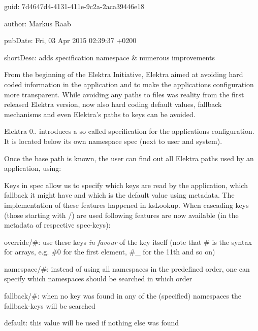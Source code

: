 
\begin{DoxyItemize}
\item guid\+: 7d4647d4-\/4131-\/411e-\/9c2a-\/2aca39446e18
\item author\+: Markus Raab
\item pub\+Date\+: Fri, 03 Apr 2015 02\+:39\+:37 +0200
\item short\+Desc\+: adds specification namespace \& numerous improvements
\end{DoxyItemize}

From the beginning of the Elektra Initiative, Elektra aimed at avoiding hard coded information in the application and to make the application\textquotesingle{}s configuration more transparent. While avoiding any paths to files was reality from the first released Elektra version, now also hard coding default values, fallback mechanisms and even Elektra’s paths to keys can be avoided.

Elektra 0.. introduces a so called specification for the application\textquotesingle{}s configuration. It is located below its own namespace {\ttfamily spec} (next to user and system).

Once the base path is known, the user can find out all Elektra paths used by an application, using\+:


\begin{DoxyCode}{0}
\end{DoxyCode}


Keys in {\ttfamily spec} allow us to specify which keys are read by the application, which fallback it might have and which is the default value using metadata. The implementation of these features happened in {\ttfamily ks\+Lookup}. When cascading keys (those starting with {\ttfamily /}) are used following features are now available (in the metadata of respective {\ttfamily spec}-\/keys)\+:


\begin{DoxyItemize}
\item {\ttfamily override/\#}\+: use these keys {\itshape in favour} of the key itself (note that {\ttfamily \#} is the syntax for arrays, e.\+g. {\ttfamily \#0} for the first element, {\ttfamily \#\+\_} for the 11th and so on)
\item {\ttfamily namespace/\#}\+: instead of using all namespaces in the predefined order, one can specify which namespaces should be searched in which order
\item {\ttfamily fallback/\#}\+: when no key was found in any of the (specified) namespaces the {\ttfamily fallback}-\/keys will be searched
\item {\ttfamily default}\+: this value will be used if nothing else was found
\end{DoxyItemize}

